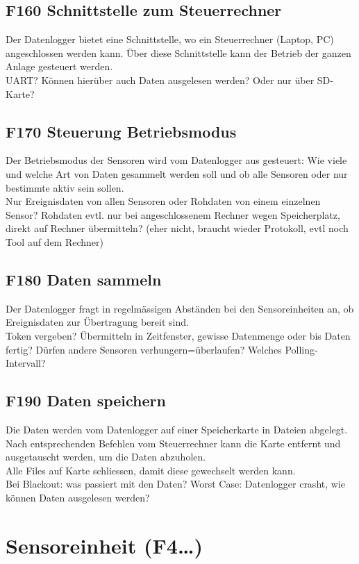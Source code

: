 \subsection{F160 Schnittstelle zum Steuerrechner}
Der Datenlogger bietet eine Schnittstelle, wo ein Steuerrechner (Laptop, PC) angeschlossen werden kann. Über diese Schnittstelle kann der Betrieb der ganzen Anlage gesteuert werden.\\
 UART? Können hierüber auch Daten ausgelesen werden? Oder nur über SD-Karte?

\subsection{F170 Steuerung Betriebsmodus}
Der Betriebsmodus der Sensoren wird vom Datenlogger aus gesteuert: Wie viele und welche Art von Daten gesammelt werden soll und ob alle Sensoren oder nur bestimmte aktiv sein sollen. \\
Nur Ereignisdaten von allen Sensoren oder Rohdaten von einem einzelnen Sensor? Rohdaten evtl. nur bei angeschlossenem Rechner wegen Speicherplatz, direkt auf Rechner übermitteln? (eher nicht, braucht wieder Protokoll, evtl noch Tool auf dem Rechner)

\subsection{F180 Daten sammeln}
Der Datenlogger fragt in regelmässigen Abständen bei den Sensoreinheiten an, ob Ereignisdaten zur Übertragung bereit sind.\\
Token vergeben? Übermitteln in Zeitfenster, gewisse Datenmenge oder bis Daten fertig? Dürfen andere Sensoren verhungern=überlaufen? Welches Polling-Intervall?

\subsection{F190 Daten speichern}
Die Daten werden vom Datenlogger auf einer Speicherkarte in Dateien abgelegt. Nach entsprechenden Befehlen vom Steuerrechner kann die Karte entfernt und ausgetauscht werden, um die Daten abzuholen.\\
Alle Files auf Karte schliessen, damit diese gewechselt werden kann.\\
Bei Blackout: was passiert mit den Daten? Worst Case: Datenlogger crasht, wie können Daten ausgelesen werden?


\section{Sensoreinheit (F4\ldots)}
